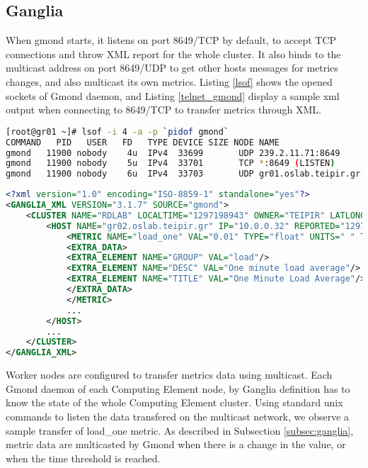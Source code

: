 \subsection{Ganglia}

When gmond starts, it listens on port 8649/TCP by default, to accept TCP connections and throw XML report for the whole cluster. It also binds to the multicast address on port 8649/UDP to get other hosts messages for metrics changes, and also multicast its own metrics. Listing \ref{lsof} shows the opened sockets of Gmond daemon, and Listing \ref{telnet_gmond} display a sample xml output when connecting to 8649/TCP to transfer metrics through XML.

\begin{lstlisting}[language=bash,caption=Gmond networking,label=lsof]
[root@gr01 ~]# lsof -i 4 -a -p `pidof gmond`
COMMAND   PID   USER   FD   TYPE DEVICE SIZE NODE NAME
gmond   11900 nobody    4u  IPv4  33699       UDP 239.2.11.71:8649 
gmond   11900 nobody    5u  IPv4  33701       TCP *:8649 (LISTEN)
gmond   11900 nobody    6u  IPv4  33703       UDP gr01.oslab.teipir.gr:39991->239.2.11.71:8649 
\end{lstlisting}

\begin{lstlisting}[language=XML,caption=Gmond XML cluster report,label=telnet_gmond]
<?xml version="1.0" encoding="ISO-8859-1" standalone="yes"?>
<GANGLIA_XML VERSION="3.1.7" SOURCE="gmond">
	<CLUSTER NAME="RDLAB" LOCALTIME="1297198943" OWNER="TEIPIR" LATLONG="unspecified" URL="unspecified">
		<HOST NAME="gr02.oslab.teipir.gr" IP="10.0.0.32" REPORTED="1297198934" TN="8" TMAX="20" DMAX="0" LOCATION="unspecified" GMOND_STARTED="1296569542">
			<METRIC NAME="load_one" VAL="0.01" TYPE="float" UNITS=" " TN="50" TMAX="70" DMAX="0" SLOPE="both">
			<EXTRA_DATA>
			<EXTRA_ELEMENT NAME="GROUP" VAL="load"/>
			<EXTRA_ELEMENT NAME="DESC" VAL="One minute load average"/>
			<EXTRA_ELEMENT NAME="TITLE" VAL="One Minute Load Average"/>
			</EXTRA_DATA>
			</METRIC>
			...
		</HOST>
		...
	</CLUSTER>
</GANGLIA_XML>
\end{lstlisting}

Worker nodes are configured to transfer metrics data using multicast. Each Gmond daemon of each Computing Element node, by Ganglia definition has to know the state of the whole Computing Element cluster. Using standard unix commands to listen the data transfered on the multicast network, we observe a sample transfer of load\_one metric. As described in Subsection \ref{subsec:ganglia}, metric data are multicasted by Gmond when there is a change in the value, or when the time threshold is reached.

